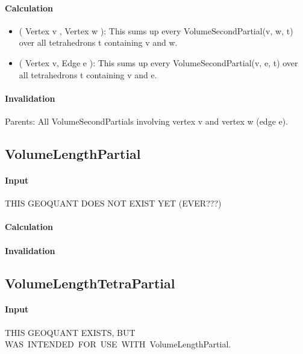 \paragraph{Calculation}

\begin{itemize}
\item ( Vertex v , Vertex w ): This sums up every VolumeSecondPartial(v, w,
t) over all tetrahedrons t containing v and w.

\item ( Vertex v, Edge e ): This sums up every VolumeSecondPartial(v, e, t)
over all tetrahedrons t containing v and e.
\end{itemize}

\paragraph{Invalidation}

Parents: All VolumeSecondPartials involving vertex v and vertex w (edge e).

\subsection{VolumeLengthPartial}

\paragraph{Input}

THIS GEOQUANT DOES NOT EXIST YET (EVER???)

\paragraph{Calculation}

\paragraph{Invalidation}

\bigskip

\subsection{VolumeLengthTetraPartial}

\paragraph{Input}

THIS GEOQUANT EXISTS, BUT WAS\ INTENDED\ FOR\ USE\ WITH\
VolumeLengthPartial. 


